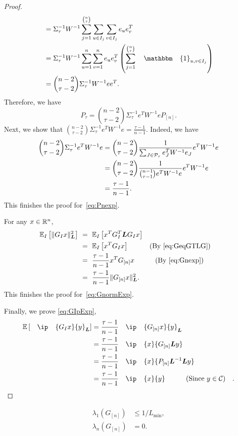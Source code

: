 \begin{proof}
\begin{align*}
        &= \Sigma_\tau^{-1} W^{-1} \sum_{j=1}^{\binom{n}{\tau}} \sum_{u \in I_j} \sum_{v \in I_j} e_ue_v^T\\
        &= \Sigma_\tau^{-1} W^{-1} \sum_{u=1}^n \sum_{v=1}^n e_ue_v^T \left(\sum_{j=1}^{\binom{n}{\tau}} \mathbbm{1}_{u,v \in I_j} \right)\\
        &= \binom{n-2}{\tau-2}\Sigma_\tau^{-1}W^{-1}ee^T.
    \end{align*}
    Therefore, we have 
    \[P_\tau = \binom{n-2}{\tau-2}\Sigma_\tau^{-1}e^TW^{-1}e P_{[n]}.\]
    Next, we show that $\binom{n-2}{\tau-2}\Sigma_\tau^{-1}e^TW^{-1}e = \frac{\tau-1}{n-1}$. Indeed, we have 
    \begin{align*}
        \binom{n-2}{\tau-2}\Sigma_\tau^{-1}e^TW^{-1}e &= \binom{n-2}{\tau-2}\frac{1}{\sum_{J \in \mathcal{P}_\tau} e_J^TW^{-1}e_J}e^TW^{-1}e\\
        &= \binom{n-2}{\tau-2} \frac{1}{\binom{n-1}{\tau-1}e^TW^{-1}e}e^TW^{-1}e\\
        &= \frac{\tau-1}{n-1}.
    \end{align*}
    This finishes the proof for~\autoref{eq:Pnexp}.
    
    For any $x\in \mathbb{R}^n$,
    \begin{align*}
        \mE_I \left[ \| G_I x \|_{\bL}^2 \right] &~=~ \mE_I \left[ x^T G_I^T \bL G_I x \right] \\
        &~=~ \mE_I \left[ x^T G_I x \right] \qquad \text{(By \autoref{eq:GeqGTLG})} \\
        &~=~ \frac{\tau - 1}{n-1}   x^T G_{[n]} x  \qquad \text{(By \autoref{eq:Gnexp})} \\
        &~=~ \frac{\tau - 1}{n-1} \| G_{[n]} x \|^2_{\bL}.
    \end{align*}
    This finishes the proof for~\autoref{eq:GnormExp}.
    
    Finally, we prove \autoref{eq:GIpExp},
    \begin{align*}
        \mE \left[\ip{G_Ix}{y}_{\bL} \right] &= \frac{\tau - 1}{n-1} \ip{G_{[n]}x}{y}_{\bL}\\
        &= \frac{\tau - 1}{n-1} \ip{x}{G_{[n]}\bL y}\\
        &= \frac{\tau - 1}{n-1} \ip{x}{P_{[n]}\bL^{-1}\bL y}\\
        &= \frac{\tau - 1}{n-1} \ip{x}{y}  \qquad \text{(Since $y \in \Cscr$)}.
    \end{align*}
\end{proof}

\begin{lemma}[Eigenvalues of $G_{[n]}$] \label{lemma:eigenG}
    \begin{align}
        \lambda_1 ( G_{[n]} ) &\leq 1/L_{\min}, \label{eq:largestEigenValG} \\
        \lambda_n ( G_{[n]} ) & = 0. \label{eq:smallestEigenValG}
    \end{align}
\end{lemma}

